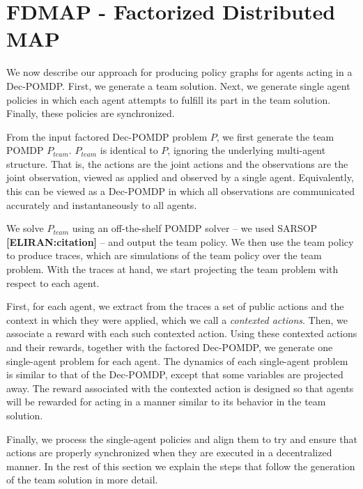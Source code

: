 \documentclass[letterpaper]{article} %
\newcommand{\eliran}[1]{\textbf{[\color{red}ELIRAN:#1]}}
\begin{document}
\section{FDMAP - Factorized Distributed MAP}

We now describe our approach for producing policy graphs for agents acting in a Dec-POMDP. First, we generate a team solution. Next,
we generate single agent policies in which each agent attempts to fulfill its part in the team solution. Finally, these policies are synchronized. 

From the input factored Dec-POMDP problem $P$, we first generate the team POMDP $P_{team}$. $P_{team}$ is identical to $P$, ignoring the underlying multi-agent structure. That is, the actions are the joint actions and the observations are the joint observation, viewed as applied 
and observed by a single agent. Equivalently, this can be viewed as a Dec-POMDP in which all observations are communicated accurately and instantaneously 
to all agents.

We solve $P_{team}$ using an off-the-shelf POMDP solver --
we used SARSOP \cite{} \eliran{citation} -- and output the team policy. We then use the team policy to produce traces, which are simulations of the team policy over the team problem. With the traces at hand, we start projecting the team problem with respect to each agent.

First, for each agent, we extract from the traces a set of public actions and the context in which they were applied, which we call a {\em contexted actions}. Then, we associate a reward with each such contexted action.  Using these contexted actions and their rewards, together with the factored Dec-POMDP, we  generate
one single-agent problem for each agent. The dynamics of each single-agent problem is similar to that of the Dec-POMDP, except that some variables are projected away. The reward associated with the contexted action is designed
so that agents will be rewarded for acting in a manner similar to its
behavior in the team solution.

Finally, we process the single-agent policies and align them to try and ensure that actions are properly synchronized when they are executed in a decentralized manner. 
In the rest of this section we explain the steps that follow the
generation of the team solution in more detail.

\end{document}
